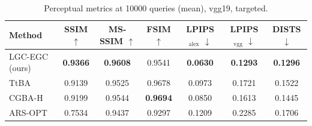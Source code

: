 \begin{table}[t]
\centering\footnotesize
\caption{Perceptual metrics at 10000 queries (mean), vgg19, targeted.}
\begin{tabular}{lcccccc}
\toprule
Method & SSIM $\uparrow$ & MS-SSIM $\uparrow$ & FSIM $\uparrow$ & LPIPS$_{\mathrm{alex}}$ $\downarrow$ & LPIPS$_{\mathrm{vgg}}$ $\downarrow$ & DISTS $\downarrow$ \\
\midrule
LGC-EGC (ours) & \textbf{0.9366} & \textbf{0.9608} & 0.9541 & \textbf{0.0630} & \textbf{0.1293} & \textbf{0.1296} \\
TtBA & 0.9139 & 0.9525 & 0.9678 & 0.0973 & 0.1721 & 0.1522 \\
CGBA-H & 0.9199 & 0.9544 & \textbf{0.9694} & 0.0850 & 0.1613 & 0.1445 \\
ARS-OPT & 0.7534 & 0.9437 & 0.9297 & 0.1209 & 0.2285 & 0.1706 \\
\bottomrule
\end{tabular}
\end{table}
